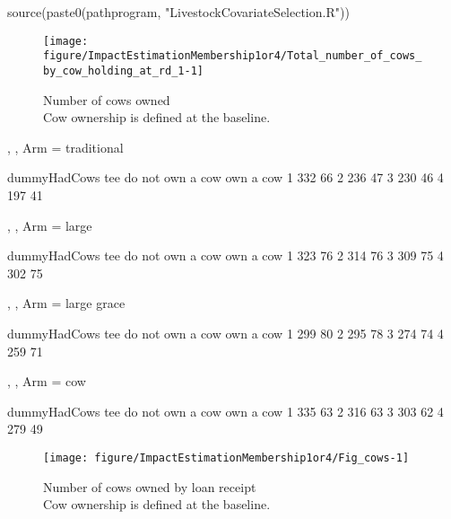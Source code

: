 \begin{Schunk}
\begin{Sinput}
source(paste0(pathprogram, "LivestockCovariateSelection.R"))
\end{Sinput}
\end{Schunk}

\begin{Schunk}
\begin{figure}

{\centering \texttt{[image: figure/ImpactEstimationMembership1or4/Total\_number\_of\_cows\_by\_cow\_holding\_at\_rd\_1-1]} 

}

\caption{Number of cows owned\\ {\footnotesize Cow ownership is defined at the baseline.\setlength{\baselineskip}{8pt}}}\label{Figure Total number of cows by cow holding at rd 1}
\end{figure}
\end{Schunk}
\begin{Schunk}
\begin{Soutput}
, , Arm = traditional

   dummyHadCows
tee do not own a cow own a cow
  1              332        66
  2              236        47
  3              230        46
  4              197        41

, , Arm = large

   dummyHadCows
tee do not own a cow own a cow
  1              323        76
  2              314        76
  3              309        75
  4              302        75

, , Arm = large grace

   dummyHadCows
tee do not own a cow own a cow
  1              299        80
  2              295        78
  3              274        74
  4              259        71

, , Arm = cow

   dummyHadCows
tee do not own a cow own a cow
  1              335        63
  2              316        63
  3              303        62
  4              279        49
\end{Soutput}
\begin{figure}

{\centering \texttt{[image: figure/ImpactEstimationMembership1or4/Fig\_cows-1]} 

}

\caption{Number of cows owned by loan receipt\\ {\footnotesize Cow ownership is defined at the baseline.\setlength{\baselineskip}{8pt}}}\label{Figure Fig cows}
\end{figure}
\end{Schunk}
